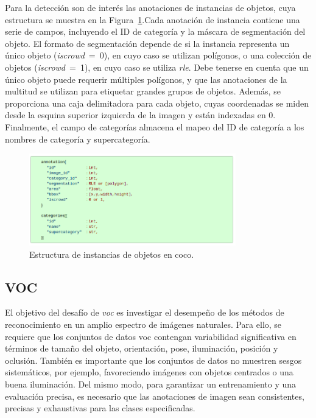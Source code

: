 Para la detección son de interés las anotaciones de instancias de objetos, cuya estructura se muestra en la Figura~\ref{fig.objInst}.Cada anotación de instancia contiene una serie de campos, incluyendo el ID de categoría y la máscara de segmentación del objeto. El formato de segmentación depende de si la instancia representa un único objeto (\textit{iscrowd}~=~0), en cuyo caso se utilizan polígonos, o una colección de objetos (\textit{iscrowd}~=~1), en cuyo caso se utiliza \textit{\acrfull{rle}}. Debe tenerse en cuenta que un único objeto puede requerir múltiples polígonos, y que las anotaciones de la multitud se utilizan para etiquetar grandes grupos de objetos. Además, se proporciona una caja delimitadora para cada objeto, cuyas coordenadas se miden desde la esquina superior izquierda de la imagen y están indexadas en 0. Finalmente, el campo de categorías  almacena el mapeo del ID de categoría a los nombres de categoría y supercategoría.

\begin{figure}[H]
	\begin{center}
		\includegraphics[width=0.8\textwidth]{figures/instancia_objetos.png}
		\caption{Estructura de instancias de objetos en \acrshort{coco}.}
		\label{fig.objInst}
	\end{center}
\end{figure}

\subsection{VOC}
El objetivo del desafío de \textit{\acrfull{voc}} \cite{Everingham10} es investigar el desempeño de los métodos de reconocimiento en un amplio espectro de imágenes naturales. Para ello, se requiere que los conjuntos de datos \acrshort{voc} contengan variabilidad significativa en términos de tamaño del objeto, orientación, pose, iluminación, posición y oclusión. También es importante que los conjuntos de datos no muestren sesgos sistemáticos, por ejemplo, favoreciendo imágenes con objetos centrados o una buena iluminación. Del mismo modo, para garantizar un entrenamiento y una evaluación precisa, es necesario que las anotaciones de imagen sean consistentes, precisas y exhaustivas para las clases especificadas.\\

